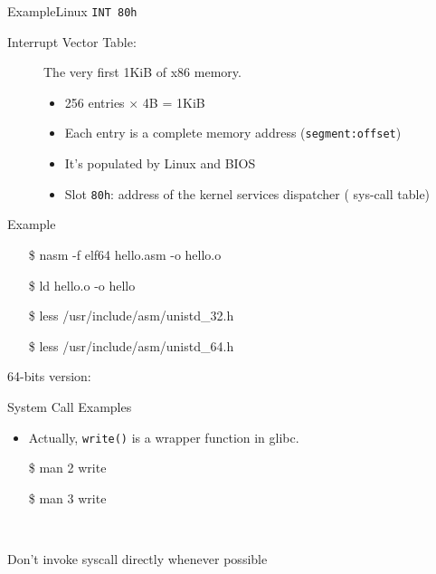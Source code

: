 \begin{frame}{Example}{Linux \texttt{INT 80h}}
  \begin{description}
  \item[Interrupt Vector Table:] The very first 1KiB of x86 memory. 
    \begin{itemize} 
    \item 256 entries $\times$ 4B = 1KiB
    \item Each entry is a complete memory address (\texttt{segment:offset})
    \item It's populated by Linux and BIOS
    \item Slot \texttt{80h}: address of the kernel services dispatcher ({\pright} sys-call table)
    \end{itemize}
  \end{description}
\end{frame}

\begin{frame}{Example}
  \centering
  \begin{iblock}{}
    \ttfamily\footnotesize
    \begin{enumerate}
    \item[\$] nasm -f elf64 hello.asm -o hello.o
    \item[\$] ld hello.o -o hello
    \item[\$] less /usr/include/asm/unistd\_32.h
    \item[\$] less /usr/include/asm/unistd\_64.h
    \end{enumerate}
  \end{iblock}
\end{frame}

64-bits version:

\begin{frame}{System Call Examples}
  \begin{minipage}{.5\linewidth}
  \end{minipage}\quad
  \begin{minipage}{.45\linewidth}\ttfamily\footnotesize
    \begin{itemize}
    \item Actually, \texttt{write()} is a wrapper function in glibc.
    \item[\$] man 2 write
    \item[\$] man 3 write
    \end{itemize}
  \end{minipage}\\[1em]
  \begin{description}
  \item[Don't invoke syscall directly whenever possible]
  \end{description}
\end{frame}

